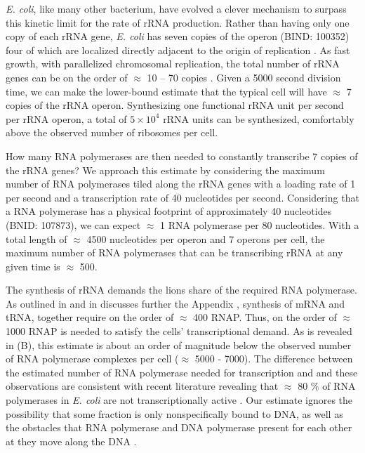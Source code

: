 \textit{E. coli}, like many other bacterium, have evolved a clever mechanism to surpass this kinetic limit
for the rate of rRNA production. Rather than having only one copy of each rRNA
gene, \textit{E. coli} has seven copies of the operon (BIND: 100352) four of which are localized directly adjacent to the origin of
replication \citep{birnbaum1971}. As fast growth, with
parallelized chromosomal replication, the total number of rRNA genes can be on
the order of $\approx$ 10 -- 70 copies \citep{stevenson2004}.  Given a 5000
second division time, we can make the lower-bound estimate that the typical cell
will have $\approx$ 7 copies of the rRNA operon. Synthesizing one functional
rRNA unit per second per rRNA operon, a total of $5 \times 10^4$ rRNA units can
be synthesized, comfortably above the observed number of ribosomes per cell.

How many RNA polymerases are then needed to constantly transcribe 7 copies of
the rRNA genes? We approach this estimate by considering the maximum number
of RNA polymerases tiled along the rRNA genes with a loading rate of 1 per
second and a transcription rate of 40 nucleotides per second. Considering
that a RNA polymerase has a physical footprint of approximately 40
nucleotides (BNID: 107873), we can expect
$\approx$ 1 RNA polymerase per 80 nucleotides. With a total length of
$\approx$ 4500 nucleotides per operon and 7 operons per cell, the maximum
number of RNA polymerases that can be transcribing rRNA at any given time is
$\approx$ 500.

The synthesis of rRNA demands the lions share of the required RNA polymerase. As
outlined in  and in discusses further the Appendix
, synthesis of mRNA and tRNA, together require on
the order of $\approx$ 400 RNAP. Thus, on the order of $\approx$ 1000 RNAP is
needed to satisfy the cells' transcriptional demand. As is revealed in
(B), this estimate is about an order of magnitude below the
observed number of RNA polymerase complexes per cell ($\approx$ 5000 - 7000).
The difference between the estimated number of RNA polymerase needed for
transcription and and these observations are consistent with recent literature
revealing that $\approx$ 80 \% of RNA polymerases in \textit{E. coli} are not
transcriptionally active \citep{patrick2015}. Our estimate ignores the
possibility that some fraction is only nonspecifically bound to DNA, as well as
the obstacles that RNA polymerase and DNA polymerase present for each other at
they move along the DNA \citep{finkelstein2013}.

